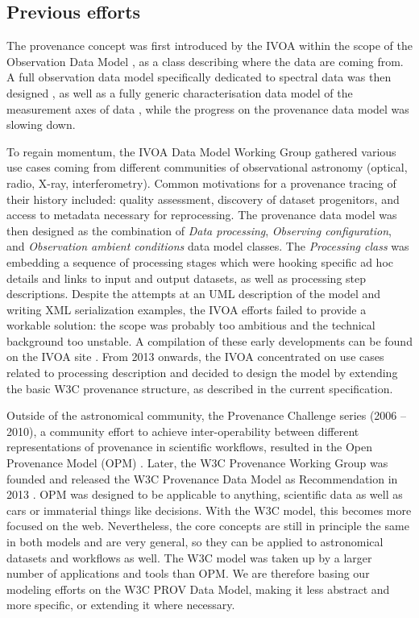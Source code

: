 \subsection{Previous efforts}
The provenance concept was first introduced by the IVOA within the scope of the
Observation Data Model \citep[see IVOA Note by ][]{note:observationdm}, as a
class describing where the data are coming from. A full observation data model
specifically dedicated to spectral data was then designed \citep[Spectral Data
Model,][]{2007ivoa.spec.1029M}, as well as a fully generic characterisation
data model of the measurement axes of data \citep[Characterisation Data
Model,][]{2008ivoa.spec.0325L}, while the progress on the provenance data
model was slowing down.

To regain momentum, the IVOA Data Model Working Group  gathered various use cases coming from
different communities of observational astronomy (optical, radio, X-ray,
interferometry). Common motivations for a provenance tracing of their history
included: quality assessment, discovery of dataset progenitors, and access to
metadata necessary for reprocessing. The provenance data model was then designed
as the combination of \emph{Data processing}, \emph{Observing configuration},
and \emph{Observation ambient conditions} data model classes.
The \emph{Processing class} was embedding a sequence of processing stages which
were hooking specific ad hoc details and links to input and output datasets,
as well as processing step descriptions. Despite the attempts at
an UML description of the model and writing XML serialization examples, the IVOA
efforts failed to provide a workable solution: the scope was probably too
ambitious and the technical background too unstable. A compilation of these
early developments can be found on the IVOA site \citep{std:previousefforts}.
From 2013 onwards, the IVOA concentrated on use cases related to processing
description and decided to design the model by extending the basic W3C
provenance structure, as described in the current specification. 

Outside of the astronomical community, the Provenance Challenge series (2006 --
2010), a community effort to achieve inter-operability between different
representations of provenance in scientific workflows, resulted in the Open
Provenance Model (OPM) \citep{moreau2010}. Later, the W3C Provenance Working
Group was founded and released the W3C Provenance Data Model as Recommendation
in 2013 \citep{std:W3CProvDM}. OPM was designed to be applicable to anything,
scientific data as well as cars or immaterial things like decisions. With the
W3C model, this becomes more focused on the web. Nevertheless, the core concepts
are still in principle the same in both models and are very general, so they
can be applied to astronomical datasets and workflows as well. The W3C model was
taken up by a larger number of applications and tools than OPM. We are therefore
basing our modeling efforts on the W3C PROV Data Model, making it less
abstract and more specific, or extending it where necessary. 


